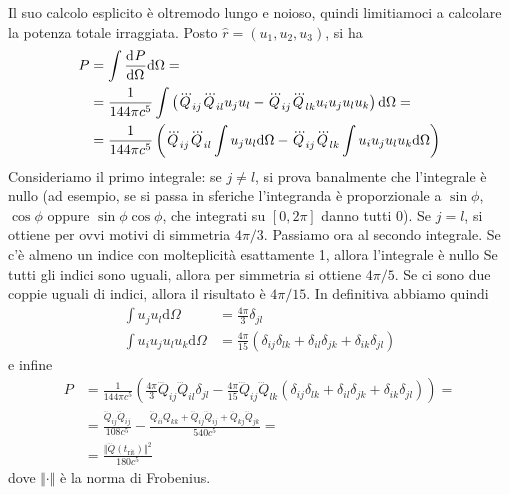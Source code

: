 \documentclass[a4paper,11pt]{article}
\renewcommand{\d}{\mathrm{d}}
\renewcommand{\t}{t_{\mathrm{rit}}}
\begin{document}
Il suo calcolo esplicito è oltremodo lungo e noioso, quindi limitiamoci a calcolare la potenza totale irraggiata. Posto $\hat{r}=(u_1,u_2,u_3)$, si ha
\begin{align*}
	P&=\int\der{P}{\Omega}\d\Omega=\\&=\frac{1}{144\pi c^5}\int\left(\dddot Q_{ij}\dddot Q_{il}u_ju_l-\dddot Q_{ij}\dddot Q_{lk}u_iu_ju_lu_k\right)\d\Omega=\\&=\frac{1}{144\pi c^5}\left(\dddot Q_{ij}\dddot Q_{il}\int u_ju_l\d\Omega-\dddot Q_{ij}\dddot Q_{lk}\int u_iu_ju_lu_k\d\Omega\right)
\end{align*}
Consideriamo il primo integrale: se $j\neq l$, si prova banalmente che l'integrale è nullo (ad esempio, se si passa in sferiche l'integranda è proporzionale a $\sin\phi$, $\cos\phi$ oppure $\sin\phi\cos\phi$, che integrati su $[0,2\pi]$ danno tutti 0). Se $j=l$, si ottiene per ovvi motivi di simmetria $4\pi/3$. Passiamo ora al secondo integrale. Se c'è almeno un indice con molteplicità esattamente 1, allora l'integrale è nullo Se tutti gli indici sono uguali, allora per simmetria si ottiene $4\pi/5$. Se ci sono due coppie uguali di indici, allora il risultato è $4\pi/15$. In definitiva abbiamo quindi
\begin{align*}\int u_ju_l\d\Omega&=\frac{4\pi}{3}\delta_{jl}
\\\int u_iu_ju_lu_k\d\Omega&=\frac{4\pi}{15}(\delta_{ij}\delta_{lk}+\delta_{il}\delta_{jk}+\delta_{ik}\delta_{jl})\end{align*}
e infine
\begin{align*}
	P&=\frac{1}{144\pi c^5}\left(\frac{4\pi}{3}\dddot Q_{ij}\dddot Q_{il}\delta_{jl}-\frac{4\pi}{15}\dddot Q_{ij}\dddot Q_{lk}(\delta_{ij}\delta_{lk}+\delta_{il}\delta_{jk}+\delta_{ik}\delta_{jl})\right)=\\&=\frac{\dddot Q_{ij}\dddot Q_{ij}}{108c^5}-\frac{\dddot Q_{ii}Q_{kk}+\dddot Q_{ij}\dddot Q_{ij}+\dddot Q_{kj}\dddot Q_{jk}}{540c^5}=\\&=\frac{\Vert\dddot Q(\t)\Vert^2}{180c^5}
\end{align*}
dove $\Vert\cdot\Vert$ è la norma di Frobenius. 
\end{document}

